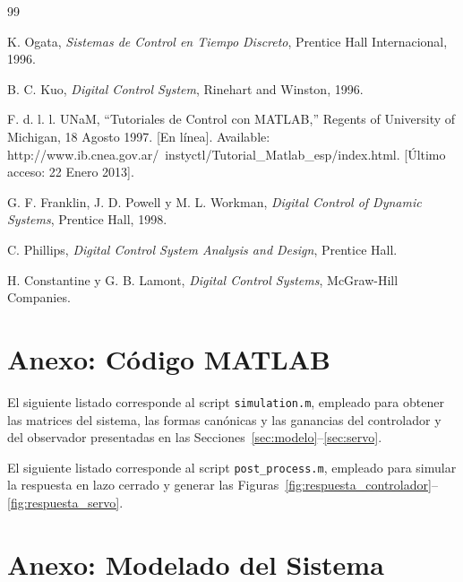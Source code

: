 \documentclass[conference]{IEEEtran}
\begin{document}

\begin{thebibliography}{99}

K. Ogata, \textit{Sistemas de Control en Tiempo Discreto}, Prentice Hall Internacional, 1996.

B. C. Kuo, \textit{Digital Control System}, Rinehart and Winston, 1996.

F. d. l. l. UNaM, ``Tutoriales de Control con MATLAB,'' Regents of University of Michigan, 18 Agosto 1997. [En línea]. Available: http://www.ib.cnea.gov.ar/~instyctl/Tutorial\_Matlab\_esp/index.html. [Último acceso: 22 Enero 2013].

G. F. Franklin, J. D. Powell y M. L. Workman, \textit{Digital Control of Dynamic Systems}, Prentice Hall, 1998.

C. Phillips, \textit{Digital Control System Analysis and Design}, Prentice Hall.

H. Constantine y G. B. Lamont, \textit{Digital Control Systems}, McGraw-Hill Companies.

\end{thebibliography}

\section*{Anexo: Código MATLAB}

El siguiente listado corresponde al script \texttt{simulation.m}, empleado para obtener las matrices del sistema, las formas canónicas y las ganancias del controlador y del observador presentadas en las Secciones~\ref{sec:modelo}--\ref{sec:servo}.



El siguiente listado corresponde al script \texttt{post\_process.m}, empleado para simular la respuesta en lazo cerrado y generar las Figuras~\ref{fig:respuesta_controlador}--\ref{fig:respuesta_servo}.



\section*{Anexo: Modelado del Sistema}
\end{document}
